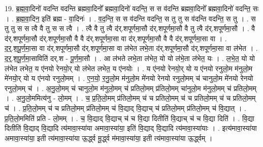 \documentclass[17pt]{extarticle}
\begin{document}
19. ब्र॒ह्म॒वा॒दिनो॑ वदन्ति वदन्ति ब्रह्मवा॒दिनो᳚ ब्रह्मवा॒दिनो॑ वदन्ति॒ स स व॑दन्ति ब्रह्मवा॒दिनो᳚ ब्रह्मवा॒दिनो॑ वदन्ति॒ सः । . ब्र॒ह्म॒वा॒दिन॒ इति॑ ब्रह्म - वा॒दिनः॑ । . व॒द॒न्ति॒ स स व॑दन्ति वदन्ति॒ स तु तु स व॑दन्ति वदन्ति॒ स तु । . स तु तु स स त्वै वै तु स स त्वै । . त्वै वै तु त्वै द॑र्.शपूर्णमा॒सौ द॑र्.शपूर्णमा॒सौ वै तु त्वै द॑र्.शपूर्णमा॒सौ । . वै द॑र्.शपूर्णमा॒सौ द॑र्.शपूर्णमा॒सौ वै वै द॑र्.शपूर्णमा॒सा वा द॑र्.शपूर्णमा॒सौ वै वै द॑र्.शपूर्णमा॒सा वा । . द॒र्॒.श॒पू॒र्ण॒मा॒सा वा द॑र्.शपूर्णमा॒सौ द॑र्.शपूर्णमा॒सा वा ल॑भेत लभे॒ता द॑र्.शपूर्णमा॒सौ द॑र्.शपूर्णमा॒सा वा ल॑भेत । . द॒र्॒.श॒पू॒र्ण॒मा॒साविति॑ दर्.श - पू॒र्ण॒मा॒सौ । . आ ल॑भते लभे॒ता ल॑भेत॒ यो यो ल॑भे॒ता ल॑भेत॒ यः । . ल॒भे॒त॒ यो यो ल॑भेत लभेत॒ य ए॑नयो रेनयो॒र् यो ल॑भेत लभेत॒ य ए॑नयोः । . य ए॑नयो रेनयो॒र् यो य ए॑नयो रनुलो॒म म॑नुलो॒म मे॑नयो॒र् यो य ए॑नयो रनुलो॒मम् । . ए॒न॒यो॒ र॒नु॒लो॒म म॑नुलो॒म मे॑नयो रेनयो रनुलो॒मम् च॑ चानुलो॒म मे॑नयो रेनयो रनुलो॒मम् च॑ । . अ॒नु॒लो॒मम् च॑ चानुलो॒म म॑नुलो॒मम् च॑ प्रतिलो॒मम् प्र॑तिलो॒मम् चा॑नुलो॒म म॑नुलो॒मम् च॑ प्रतिलो॒मम् । . अ॒नु॒लो॒ममित्य॑नु - लो॒मम् । . च॒ प्र॒ति॒लो॒मम् प्र॑तिलो॒मम् च॑ च प्रतिलो॒मम् च॑ च प्रतिलो॒मम् च॑ च प्रतिलो॒मम् च॑ । . प्र॒ति॒लो॒मम् च॑ च प्रतिलो॒मम् प्र॑तिलो॒मम् च॑ वि॒द्याद् वि॒द्याच् च॑ प्रतिलो॒मम् प्र॑तिलो॒मम् च॑ वि॒द्यात् । . प्र॒ति॒लो॒ममिति॑ प्रति - लो॒मम् । . च॒ वि॒द्याद् वि॒द्याच् च॑ च वि॒द्या दितीति॑ वि॒द्याच् च॑ च वि॒द्या दिति॑ । . वि॒द्या दितीति॑ वि॒द्याद् वि॒द्यादि त्य॑मावा॒स्या॑या अमावा॒स्या॑या॒ इति॑ वि॒द्याद् वि॒द्यादि त्य॑मावा॒स्या॑याः । . इत्य॑मावा॒स्या॑या अमावा॒स्या॑या॒ इती त्य॑मावा॒स्या॑या ऊ॒र्द्ध्व मू॒र्द्ध्व म॑मावा॒स्या॑या॒ इती त्य॑मावा॒स्या॑या ऊ॒र्द्ध्वम् । \newline
\end{document}
